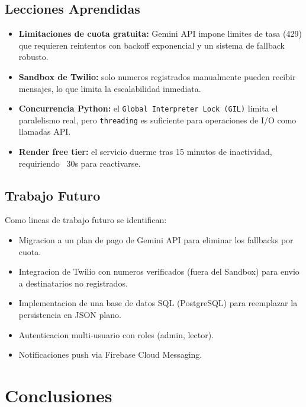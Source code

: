\documentclass[10pt,twocolumn,a4paper]{article}
\begin{document}
\subsection{Lecciones Aprendidas}

\begin{itemize}
  \item \textbf{Limitaciones de cuota gratuita:} Gemini API impone
  limites de tasa (429) que requieren reintentos con backoff
  exponencial y un sistema de fallback robusto.
  \item \textbf{Sandbox de Twilio:} solo numeros registrados
  manualmente pueden recibir mensajes, lo que limita la
  escalabilidad inmediata.
  \item \textbf{Concurrencia Python:} el \texttt{Global
  Interpreter Lock (GIL)} limita el paralelismo real, pero
  \texttt{threading} es suficiente para operaciones de I/O como
  llamadas API.
  \item \textbf{Render free tier:} el servicio duerme tras 15
  minutos de inactividad, requiriendo ~30s para reactivarse.
\end{itemize}

\subsection{Trabajo Futuro}

Como lineas de trabajo futuro se identifican:
\begin{itemize}
  \item Migracion a un plan de pago de Gemini API para eliminar
  los fallbacks por cuota.
  \item Integracion de Twilio con numeros verificados (fuera del
  Sandbox) para envio a destinatarios no registrados.
  \item Implementacion de una base de datos SQL (PostgreSQL) para
  reemplazar la persistencia en JSON plano.
  \item Autenticacion multi-usuario con roles (admin, lector).
  \item Notificaciones push via Firebase Cloud Messaging.
\end{itemize}

\section{Conclusiones}
\end{document}
